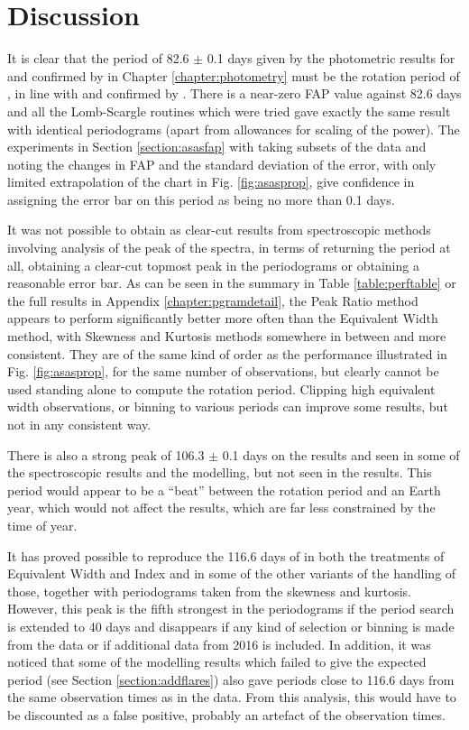 \chapter{Discussion}
\protect\label{chapter:discussion}

It is clear that the period of 82.6 $\pm$ 0.1 days given by the photometric results for {\asas} and confirmed by {\hst}
in Chapter \ref{chapter:photometry} must be the rotation period of \prox, in line with \citet{benedict98} and confirmed
by \citet{kiraga07}. There is a near-zero FAP value against 82.6 days and all the Lomb-Scargle routines which were tried
gave exactly the same result with identical periodograms (apart from allowances for scaling of the power). The
experiments in Section \ref{section:asasfap} with taking subsets of the data and noting the changes in FAP and the
standard deviation of the error, with only limited extrapolation of the chart in Fig. \ref{fig:asasprop}, give
confidence in assigning the error bar on this period as being no more than 0.1 days.

It was not possible to obtain as clear-cut results from spectroscopic methods involving analysis of the {\ha} peak of
the {\prox} spectra, in terms of returning the period at all, obtaining a clear-cut topmost peak in the periodograms or
obtaining a reasonable error bar. As can be seen in the summary in Table \ref{table:perftable} or the full results in
Appendix \ref{chapter:pgramdetail}, the Peak Ratio method appears to perform significantly better more often than the
Equivalent Width method, with Skewness and Kurtosis methods somewhere in between and more consistent. They are of the
same kind of order as the performance illustrated in Fig. \ref{fig:asasprop}, for the same number of observations, but
clearly cannot be used standing alone to compute the rotation period. Clipping high equivalent width observations, or
binning to various periods can improve some results, but not in any consistent way.

There is also a strong peak of 106.3 $\pm$ 0.1 days on the {\asas} results and seen in some of the spectroscopic results
and the modelling, but not seen in the {\hst} results. This period would appear to be a ``beat'' between the rotation
period and an Earth year, which would not affect the {\hst} results, which are far less constrained by the time of year.

It has proved possible to reproduce the 116.6 days of \citet[Table 3]{suarezmascareno15} in both the treatments of
Equivalent Width and {\ha} Index and in some of the other variants of the handling of those, together with periodograms
taken from the skewness and kurtosis. However, this peak is the fifth strongest in the periodograms if the period search
is extended to 40 days and disappears if any kind of selection or binning is made from the data or if additional data
from 2016 is included. In addition, it was noticed that some of the modelling results which failed to give the expected
period (see Section \ref{section:addflares}) also gave periods close to 116.6 days from the same observation times as in
the {\harps} data. From this analysis, this would have to be discounted as a false positive, probably an artefact of the
observation times.


